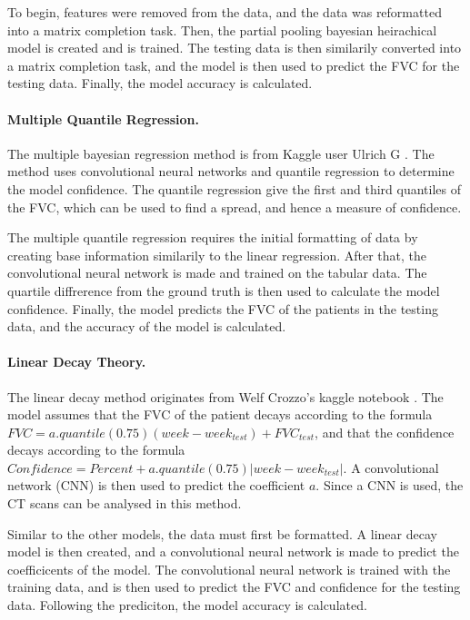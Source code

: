 \documentclass[12pt]{article}
\begin{document}
To begin, features were removed from the data, and the data was reformatted into a matrix completion task.
Then, the partial pooling bayesian heirachical model is created and is trained.
The testing data is then similarily converted into a matrix completion task, and the model is then used to predict the FVC for the testing data.
Finally, the model accuracy is calculated.

\paragraph*{Multiple Quantile Regression.}

The multiple bayesian regression method is from Kaggle user Ulrich G \cite{multiplequantile}. 
The method uses convolutional neural networks and quantile regression to determine the model confidence. 
The quantile regression give the first and third quantiles of the FVC, which can be used to find a spread, and hence a measure of confidence. 

The multiple quantile regression requires the initial formatting of data by creating base information similarily to the linear regression.
After that, the convolutional neural network is made and trained on the tabular data.
The quartile diffrerence from the ground truth is then used to calculate the model confidence.
Finally, the model predicts the FVC of the patients in the testing data, and the accuracy of the model is calculated.

\paragraph*{Linear Decay Theory.}

The linear decay method originates from Welf Crozzo's kaggle notebook \cite{lineardecay}.
The model assumes that the FVC of the patient decays according to the formula $FVC = a.quantile(0.75)(week - week_{test}) + FVC_{test}$, and that the confidence decays according to the formula $Confidence = Percent + a.quantile(0.75)|week - week_{test}|$.
A convolutional network (CNN) is then used to predict the coefficient $a$. 
Since a CNN is used, the CT scans can be analysed in this method.

Similar to the other models, the data must first be formatted. 
A linear decay model is then created, and a convolutional neural network is made to predict the coefficicents of the model.
The convolutional neural network is trained with the training data, and is then used to predict the FVC and confidence for the testing data.
Following the prediciton, the model accuracy is calculated.
\end{document}
